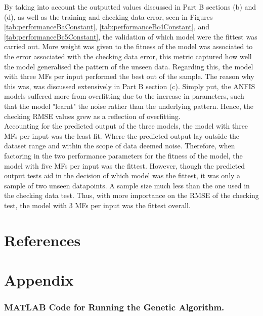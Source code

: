 \documentclass[12pt]{article}
\begin{document}
By taking into account the outputted values discussed in Part B sections (b) and (d), as well as the training and checking data error, seen in Figures \ref{tab:performanceBaConstant}, \ref{tab:performanceBc4Constant}, and \ref{tab:performanceBc5Constant}, the validation of which model were the fittest was carried out.
More weight was given to the fitness of the model was associated to the error associated with the checking data error, this metric captured how well the model generalised the pattern of the unseen data.
Regarding this, the model with three MFs per input performed the best out of the sample.
The reason why this was, was discussed extensively in Part B section (c).
Simply put, the ANFIS models suffered more from overfitting due to the increase in parameters, such that the model "learnt" the noise rather than the underlying pattern.
Hence, the checking RMSE values grew as a reflection of overfitting.
\\

Accounting for the predicted output of the three models, the model with three MFs per input was the least fit.
Where the predicted output lay outside the dataset range and within the scope of data deemed noise.
Therefore, when factoring in the two performance parameters for the fitness of the model, the model with five MFs per input was the fittest.
However, though the predicted output tests aid in the decision of which model was the fittest, it was only a sample of two unseen datapoints.
A sample size much less than the one used in the checking data test.
Thus, with more importance on the RMSE of the checking test, the model with 3 MFs per input was the fittest overall.
\\

\section{References}




\section{Appendix}
\subsubsection{MATLAB Code for Running the Genetic Algorithm.}
\end{document}

